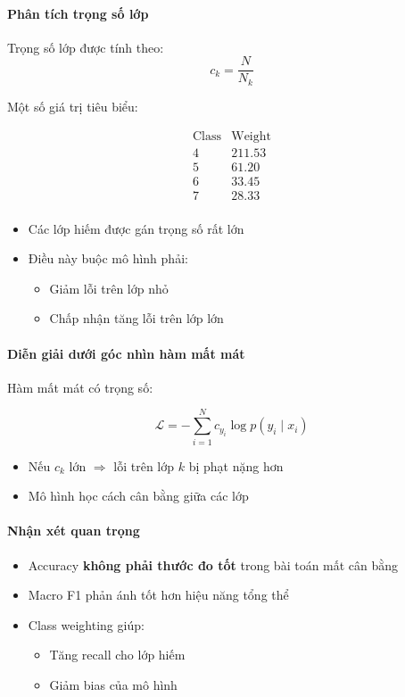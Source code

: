 \paragraph{Phân tích trọng số lớp}

Trọng số lớp được tính theo:
\[
c_k = \frac{N}{N_k}
\]

Một số giá trị tiêu biểu:

\[
\begin{array}{c|c}
\text{Class} & \text{Weight} \\
\hline
4 & 211.53 \\
5 & 61.20 \\
6 & 33.45 \\
7 & 28.33 \\
\end{array}
\]

\begin{itemize}
    \item Các lớp hiếm được gán trọng số rất lớn
    \item Điều này buộc mô hình phải:
    \begin{itemize}
        \item Giảm lỗi trên lớp nhỏ
        \item Chấp nhận tăng lỗi trên lớp lớn
    \end{itemize}
\end{itemize}

\paragraph{Diễn giải dưới góc nhìn hàm mất mát}

Hàm mất mát có trọng số:

\[
\mathcal{L} = - \sum_{i=1}^{N} c_{y_i} \log p(y_i \mid x_i)
\]

\begin{itemize}
    \item Nếu $c_k$ lớn $\Rightarrow$ lỗi trên lớp $k$ bị phạt nặng hơn
    \item Mô hình học cách cân bằng giữa các lớp
\end{itemize}

\paragraph{Nhận xét quan trọng}

\begin{itemize}
    \item Accuracy \textbf{không phải thước đo tốt} trong bài toán mất cân bằng
    \item Macro F1 phản ánh tốt hơn hiệu năng tổng thể
    \item Class weighting giúp:
    \begin{itemize}
        \item Tăng recall cho lớp hiếm
        \item Giảm bias của mô hình
    \end{itemize}
\end{itemize}

